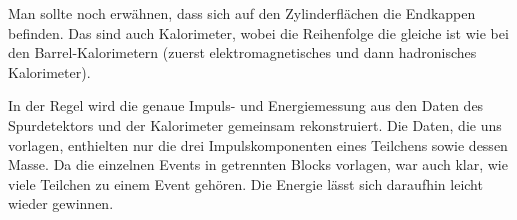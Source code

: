 Man sollte noch erwähnen, dass sich auf den Zylinderflächen die Endkappen befinden. Das sind auch Kalorimeter, wobei die Reihenfolge die gleiche ist wie bei den Barrel-Kalorimetern (zuerst elektromagnetisches und dann hadronisches Kalorimeter).

In der Regel wird die genaue Impuls- und Energiemessung aus den Daten des Spurdetektors und der Kalorimeter gemeinsam rekonstruiert. Die Daten, die uns vorlagen, enthielten nur die drei Impulskomponenten eines Teilchens sowie dessen Masse. Da die einzelnen Events in getrennten Blocks vorlagen, war auch klar, wie viele Teilchen zu einem Event gehören. Die Energie lässt sich daraufhin leicht wieder gewinnen.
